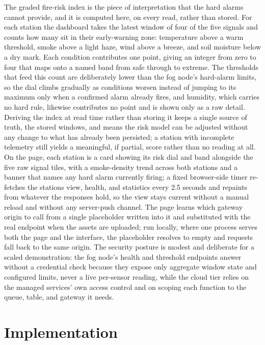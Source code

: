 \documentclass[conference]{IEEEtran}
\begin{document}
The graded fire-risk index is the piece of interpretation that the hard alarms cannot provide, and it is computed here, on every read, rather than stored. For each station the dashboard takes the latest window of four of the five signals and counts how many sit in their early-warning zone: temperature above a warm threshold, smoke above a light haze, wind above a breeze, and soil moisture below a dry mark. Each condition contributes one point, giving an integer from zero to four that maps onto a named band from safe through to extreme. The thresholds that feed this count are deliberately lower than the fog node's hard-alarm limits, so the dial climbs gradually as conditions worsen instead of jumping to its maximum only when a confirmed alarm already fires, and humidity, which carries no hard rule, likewise contributes no point and is shown only as a raw detail. Deriving the index at read time rather than storing it keeps a single source of truth, the stored windows, and means the risk model can be adjusted without any change to what has already been persisted; a station with incomplete telemetry still yields a meaningful, if partial, score rather than no reading at all. On the page, each station is a card showing its risk dial and band alongside the five raw signal tiles, with a smoke-density trend across both stations and a banner that names any hard alarm currently firing; a fixed browser-side timer re-fetches the stations view, health, and statistics every 2.5 seconds and repaints from whatever the responses hold, so the view stays current without a manual reload and without any server-push channel. The page learns which gateway origin to call from a single placeholder written into it and substituted with the real endpoint when the assets are uploaded; run locally, where one process serves both the page and the interface, the placeholder resolves to empty and requests fall back to the same origin. The security posture is modest and deliberate for a scaled demonstration: the fog node's health and threshold endpoints answer without a credential check because they expose only aggregate window state and configured limits, never a live per-sensor reading, while the cloud tier relies on the managed services' own access control and on scoping each function to the queue, table, and gateway it needs.

\section{Implementation}
\end{document}
